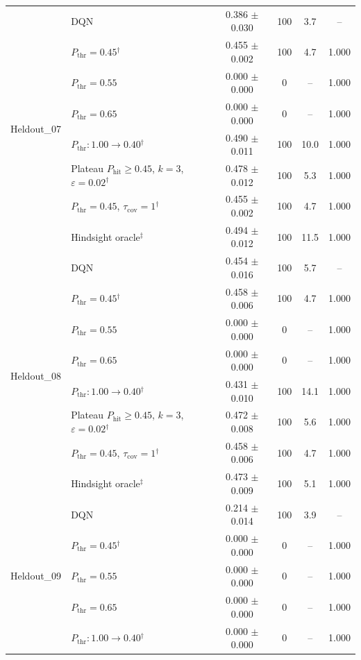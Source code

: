 \begin{table}[htbp]
\begin{tabular}{llcccc}
\midrule
\multirow{8}{*}{Heldout\_07} & DQN & 0.386 $\pm$ 0.030 & 100 & 3.7 & -- \\
 & $P_{\mathrm{thr}}=0.45$$^{\dagger}$ & 0.455 $\pm$ 0.002 & 100 & 4.7 & 1.000 \\
 & $P_{\mathrm{thr}}=0.55$ & 0.000 $\pm$ 0.000 & 0 & -- & 1.000 \\
 & $P_{\mathrm{thr}}=0.65$ & 0.000 $\pm$ 0.000 & 0 & -- & 1.000 \\
 & $P_{\mathrm{thr}}: 1.00 \to 0.40$$^{\dagger}$ & 0.490 $\pm$ 0.011 & 100 & 10.0 & 1.000 \\
 & Plateau $P_{\mathrm{hit}}\geq0.45$, $k=3$, $\varepsilon=0.02$$^{\dagger}$ & 0.478 $\pm$ 0.012 & 100 & 5.3 & 1.000 \\
 & $P_{\mathrm{thr}}=0.45$, $\tau_{\mathrm{cov}}=1$$^{\dagger}$ & 0.455 $\pm$ 0.002 & 100 & 4.7 & 1.000 \\
 & Hindsight oracle$^{\ddagger}$ & 0.494 $\pm$ 0.012 & 100 & 11.5 & 1.000 \\
\midrule
\multirow{8}{*}{Heldout\_08} & DQN & 0.454 $\pm$ 0.016 & 100 & 5.7 & -- \\
 & $P_{\mathrm{thr}}=0.45$$^{\dagger}$ & 0.458 $\pm$ 0.006 & 100 & 4.7 & 1.000 \\
 & $P_{\mathrm{thr}}=0.55$ & 0.000 $\pm$ 0.000 & 0 & -- & 1.000 \\
 & $P_{\mathrm{thr}}=0.65$ & 0.000 $\pm$ 0.000 & 0 & -- & 1.000 \\
 & $P_{\mathrm{thr}}: 1.00 \to 0.40$$^{\dagger}$ & 0.431 $\pm$ 0.010 & 100 & 14.1 & 1.000 \\
 & Plateau $P_{\mathrm{hit}}\geq0.45$, $k=3$, $\varepsilon=0.02$$^{\dagger}$ & 0.472 $\pm$ 0.008 & 100 & 5.6 & 1.000 \\
 & $P_{\mathrm{thr}}=0.45$, $\tau_{\mathrm{cov}}=1$$^{\dagger}$ & 0.458 $\pm$ 0.006 & 100 & 4.7 & 1.000 \\
 & Hindsight oracle$^{\ddagger}$ & 0.473 $\pm$ 0.009 & 100 & 5.1 & 1.000 \\
\midrule
\multirow{8}{*}{Heldout\_09} & DQN & 0.214 $\pm$ 0.014 & 100 & 3.9 & -- \\
 & $P_{\mathrm{thr}}=0.45$$^{\dagger}$ & 0.000 $\pm$ 0.000 & 0 & -- & 1.000 \\
 & $P_{\mathrm{thr}}=0.55$ & 0.000 $\pm$ 0.000 & 0 & -- & 1.000 \\
 & $P_{\mathrm{thr}}=0.65$ & 0.000 $\pm$ 0.000 & 0 & -- & 1.000 \\
 & $P_{\mathrm{thr}}: 1.00 \to 0.40$$^{\dagger}$ & 0.000 $\pm$ 0.000 & 0 & -- & 1.000 \\

\end{tabular}
\end{table}
